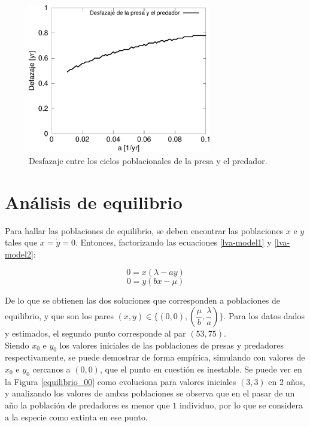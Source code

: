 \documentclass{article}
\numberwithin{equation}{section}
\begin{document}
\begin{multicols}{2}
\begin{figure}[H]
\centering
\includegraphics[width=8cm]{images/a4}
\caption{Desfazaje entre los ciclos poblacionales de la presa y el predador.}
\label{desfazaje}
\end{figure}

\section{Análisis de equilibrio}
\label{puntob}    

Para hallar las poblaciones de equilibrio, se deben encontrar las poblaciones $x$ e $y$ tales que $\dot x = \dot y = 0$. 
Entonces, factorizando las ecuaciones \ref{lva-model1} y \ref{lva-model2}:

\begin{equation}
0 = x(\lambda - a y)
\end{equation}
\begin{equation}
0 = y(b x - \mu)
\end{equation}

De lo que se obtienen las dos soluciones que corresponden a poblaciones de equilibrio, y que son los pares $(x,y) \in \{(0,0),(\dfrac{\mu}{b},\dfrac{\lambda}{a})\}$. Para los datos dados y estimados, el segundo punto corresponde al par $(53,75)$. \\
Siendo $x_0$ e $y_0$ los valores iniciales de las poblaciones de presas y predadores respectivamente, se puede demostrar de forma empírica, simulando con valores de $x_0$ e $y_0$ cercanos a $(0,0)$, que el punto en cuestión es inestable. Se puede ver en la Figura \ref{equilibrio_00} como evoluciona para valores iniciales $(3,3)$ en 2 años, y analizando los valores de ambas poblaciones se observa que en el pasar de un año la población de predadores es menor que $1$ individuo, por lo que se considera a la especie como extinta en ese punto. \\


\end{multicols}
\end{document}
